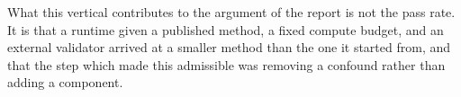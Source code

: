 What this vertical contributes to the argument of the report is not the pass rate.
It is that a runtime given a published method, a fixed compute budget, and an
external validator arrived at a smaller method than the one it started from, and
that the step which made this admissible was removing a confound rather than adding
a component.
